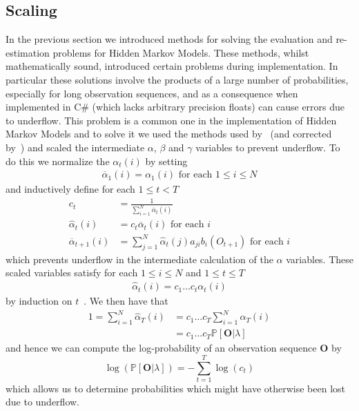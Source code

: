 \subsection{Scaling}
In the previous section we introduced methods for solving the evaluation and re-estimation problems for Hidden Markov Models. These methods, whilst mathematically sound, introduced certain problems during implementation. In particular these solutions involve the products of a large number of probabilities, especially for long observation sequences, and as a consequence when implemented in C\# (which lacks arbitrary precision floats) can cause errors due to underflow. This problem is a common one in the implementation of Hidden Markov Models and to solve it we used the methods used by~\citet{rabiner1989tutorial} (and corrected by~\cite{rahimi2000}) and scaled the intermediate $\alpha$, $\beta$ and $\gamma$ variables to prevent underflow. To do this we normalize the $\alpha_t(i)$ by setting
\begin{align*}
\overline{\alpha}_1(i) = \alpha_1(i) \text{ for each $1\leq i\leq N$} 
\end{align*}
and inductively define for each $1 \leq t < T$
\begin{align*}
c_t &= \frac{1}{\sum_{i=1}^{N}\overline{\alpha}_t(i)}\\
\hat{\alpha}_t(i) &= c_t\overline{\alpha}_t(i)\text{ for each $i$}\\
\overline{\alpha}_{t+1}(i) &= \sum_{j=1}^{N}\hat{\alpha}_t(j)a_{ji}b_i(O_{t+1}) \text{ for each $i$}
\end{align*}
which prevents underflow in the intermediate calculation of the $\alpha$ variables. These scaled variables satisfy for each $1\leq i \leq N$ and $1 \leq t \leq T$
\begin{align*}
\hat{\alpha}_t(i) = c_1\dots c_t \alpha_t(i) 
\end{align*}
by induction on $t$~\citep{stamp2004revealing}. We then have that
\begin{align*}
1 = \sum_{i=1}^{N}\hat{\alpha}_{T}(i) &= c_1\dots c_{T}\sum_{i=1}^{N}\alpha_{T}(i)\\
&=c_1\dots c_{T}\mathbb{P}[\mathbf{O}|\lambda]
\end{align*}
and hence we can compute the log-probability of an observation sequence $\mathbf{O}$ by
\begin{equation*}
\log(\mathbb{P}[\mathbf{O}|\lambda]) = -\sum_{t=1}^{T}\log(c_t)
\end{equation*}
which allows us to determine probabilities which might have otherwise been lost due to underflow. 
